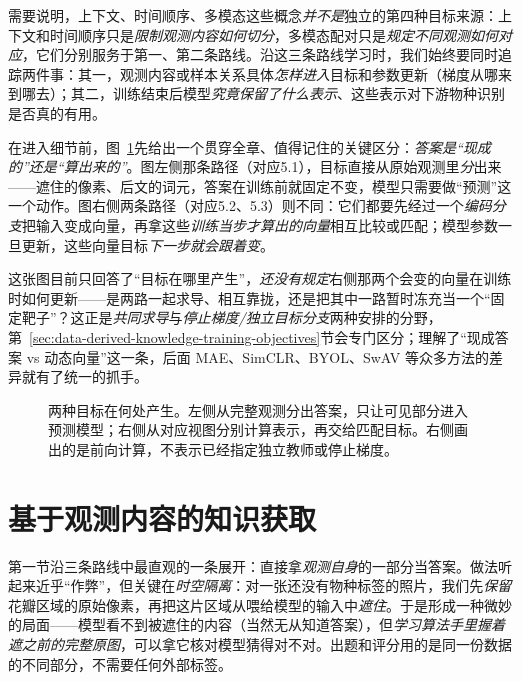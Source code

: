 需要说明，上下文、时间顺序、多模态这些概念\emph{并不是}独立的第四种目标来源：上下文和时间顺序只是\emph{限制观测内容如何切分}，多模态配对只是\emph{规定不同观测如何对应}，它们分别服务于第一、第二条路线。沿这三条路线学习时，我们始终要同时追踪两件事：其一，观测内容或样本关系具体\emph{怎样进入}目标和参数更新（梯度从哪来到哪去）；其二，训练结束后模型\emph{究竟保留了什么表示}、这些表示对下游物种识别是否真的有用。

在进入细节前，图~\ref{fig:data-derived-knowledge-target-sources}先给出一个贯穿全章、值得记住的关键区分：\emph{答案是“现成的”还是“算出来的”}。图左侧那条路径（对应5.1），目标直接从原始观测里\emph{分}出来——遮住的像素、后文的词元，答案在训练前就固定不变，模型只需要做“预测”这一个动作。图右侧两条路径（对应5.2、5.3）则不同：它们都要先经过一个\emph{编码分支}把输入变成向量，再拿这些\emph{训练当步才算出的向量}相互比较或匹配；模型参数一旦更新，这些向量目标\emph{下一步就会跟着变}。

这张图目前只回答了“目标在哪里产生”，\emph{还没有规定}右侧那两个会变的向量在训练时如何更新——是两路一起求导、相互靠拢，还是把其中一路暂时冻充当一个“固定靶子”？这正是\emph{共同求导}与\emph{停止梯度/独立目标分支}两种安排的分野，第~\ref{sec:data-derived-knowledge-training-objectives}节会专门区分；理解了“现成答案 vs 动态向量”这一条，后面 MAE、SimCLR、BYOL、SwAV 等众多方法的差异就有了统一的抓手。

\begin{figure}[htbp]
  \centering
  
  \caption{两种目标在何处产生。左侧从完整观测分出答案，只让可见部分进入预测模型；右侧从对应视图分别计算表示，再交给匹配目标。右侧画出的是前向计算，不表示已经指定独立教师或停止梯度。}
  \label{fig:data-derived-knowledge-target-sources}
\end{figure}
\FloatBarrier

\section{基于观测内容的知识获取}
\label{sec:data-derived-knowledge-observation}

第一节沿三条路线中最直观的一条展开：直接拿\emph{观测自身}的一部分当答案。做法听起来近乎“作弊”，但关键在\emph{时空隔离}：对一张还没有物种标签的照片，我们先\emph{保留}花瓣区域的原始像素，再把这片区域从喂给模型的输入中\emph{遮住}。于是形成一种微妙的局面——模型看不到被遮住的内容（当然无从知道答案），但\emph{学习算法手里握着遮之前的完整原图}，可以拿它核对模型猜得对不对。出题和评分用的是同一份数据的不同部分，不需要任何外部标签。

